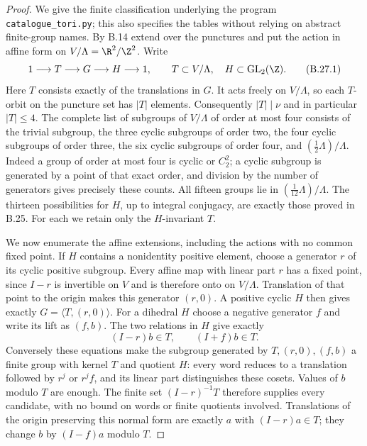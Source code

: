 \begin{proof}
We give the finite classification underlying the program
\texttt{catalogue\_tori.py}; this also specifies the tables without relying
on abstract finite-group names.  By B.14 extend over the punctures and put
the action in affine form on $V/\Lambda=\R^2/\Z^2$.  Write
\[
 1\longrightarrow T\longrightarrow G\longrightarrow H\longrightarrow1,
 \qquad T\subset V/\Lambda,\quad H\subset\mathrm{GL}_2(\Z).
                                                        \tag{B.27.1}
\]
Here $T$ consists exactly of the translations in $G$.  It acts freely on
$V/\Lambda$, so each $T$-orbit on the puncture set has $|T|$ elements.
Consequently $|T|\mid\nu$ and in particular $|T|\le4$.  The complete list
of subgroups of $V/\Lambda$ of order at most four consists of the trivial
subgroup, the three cyclic subgroups of order two, the four cyclic
subgroups of order three, the six cyclic subgroups of order four, and
$(\frac12\Lambda)/\Lambda$.  Indeed a group of order at most four is
cyclic or $C_2^2$; a cyclic subgroup is generated by a point of that exact
order, and division by the number of generators gives precisely these
counts.  All fifteen groups lie in $(\frac1{12}\Lambda)/\Lambda$.
The thirteen possibilities for $H$, up to integral conjugacy, are exactly
those proved in B.25.  For each we retain only the $H$-invariant $T$.

We now enumerate the affine extensions, including the actions with no
common fixed point.  If $H$ contains a nonidentity positive element,
choose a generator $r$ of its cyclic positive subgroup.  Every affine
map with linear part $r$ has a fixed point, since $I-r$ is invertible
on $V$ and is therefore onto on $V/\Lambda$.  Translation of that point
to the origin makes this generator $(r,0)$.  A positive cyclic $H$
then gives exactly $G=\langle T,(r,0)\rangle$.  For a dihedral $H$
choose a negative generator $f$ and write its lift as $(f,b)$.  The two
relations in $H$ give exactly
\[
       (I-r)b\in T,\qquad (I+f)b\in T.                 \tag{B.27.2}
\]
Conversely these equations make the subgroup generated by
$T,(r,0),(f,b)$ a finite group with kernel $T$ and quotient $H$:
every word reduces to a translation followed by $r^j$ or $r^jf$, and
its linear part distinguishes these cosets.  Values of $b$ modulo $T$
are enough.  The finite set $(I-r)^{-1}T$ therefore supplies every
candidate, with no bound on words or finite quotients involved.
Translations of the origin preserving this normal form are exactly
$a$ with $(I-r)a\in T$; they change $b$ by $(I-f)a$ modulo $T$.


\end{proof}
